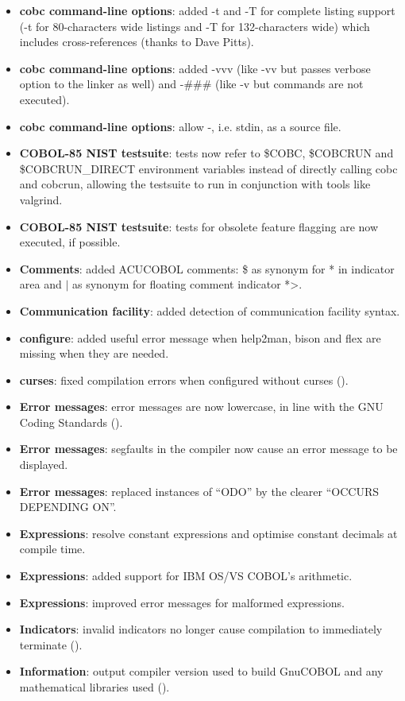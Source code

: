 \begin{itemize}
\item \textbf{cobc command-line options}: added -t and -T for complete listing support (-t for 80-characters wide listings and -T for 132-characters wide) which includes cross-references (thanks to Dave Pitts).
\item \textbf{cobc command-line options}: added -vvv (like -vv but passes verbose option to the linker as well) and -\#\#\# (like -v but commands are not executed).
\item \textbf{cobc command-line options}: allow -, i.e. stdin, as a source file.
\item \textbf{COBOL-85 NIST testsuite}: tests now refer to \$COBC, \$COBCRUN and \$COBCRUN\_DIRECT environment variables instead of directly calling cobc and cobcrun, allowing the testsuite to run in conjunction with tools like valgrind.
\item \textbf{COBOL-85 NIST testsuite}: tests for obsolete feature flagging are now executed, if possible.
\item \textbf{Comments}: added ACUCOBOL comments: \$ as synonym for * in indicator area and $\vert$ as synonym for floating comment indicator *>.
\item \textbf{Communication facility}: added detection of communication facility syntax.
\item \textbf{configure}: added useful error message when help2man, bison and flex are missing when they are needed.
\item \textbf{curses}: fixed compilation errors when configured without curses ().
\item \textbf{Error messages}: error messages are now lowercase, in line with the GNU Coding Standards ().
\item \textbf{Error messages}: segfaults in the compiler now cause an error message to be displayed.
\item \textbf{Error messages}: replaced instances of ``ODO'' by the clearer ``OCCURS DEPENDING ON''.
\item \textbf{Expressions}: resolve constant expressions and optimise constant decimals at compile time.
\item \textbf{Expressions}: added support for IBM OS\slash{}VS COBOL's arithmetic.
\item \textbf{Expressions}: improved error messages for malformed expressions.
\item \textbf{Indicators}: invalid indicators no longer cause compilation to immediately terminate ().
\item \textbf{Information}: output compiler version used to build GnuCOBOL and any mathematical libraries used ().

\end{itemize}
